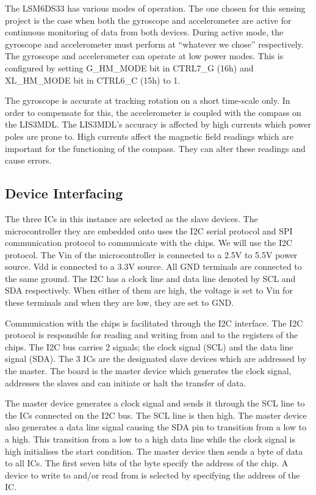 \documentclass[12pt]{article}
\begin{document}
The LSM6DS33 has various modes of operation. The one chosen for this sensing project is the case when both the gyroscope and accelerometer are active for continuous monitoring of data from both devices. During active mode, the gyroscope and accelerometer must perform at “whatever we chose” respectively. The gyroscope and accelerometer can operate at low power modes. This is configured by setting G_HM_MODE bit in CTRL7_G (16h) and XL_HM_MODE bit in CTRL6_C (15h) to 1. 

The gyroscope is accurate at tracking rotation on a short time-scale only. In order to compensate for this, the accelerometer is coupled with the compass on the LIS3MDL.
The LIS3MDL’s accuracy is affected by high currents which power poles are prone to. High currents affect the magnetic field readings which are important for the functioning of the compass. They can alter these readings and cause errors.
\subsection{Device Interfacing}
The three ICs in this instance are selected as the slave devices. The microcontroller they are embedded onto uses the I2C serial protocol and SPI communication protocol to communicate with the chips. We will use the I2C protocol. The Vin of the microcontroller is connected to a 2.5V to 5.5V power source. Vdd is connected to a 3.3V source. All GND terminals are connected to the same ground. The I2C has a clock line and data line denoted by SCL and SDA respectively. When either of them are high, the voltage is set to Vin for these terminals and when they are low, they are set to GND. 

Communication with the chips is facilitated through the I2C interface. The I2C protocol is responsible for reading and writing from and to the registers of the chips. The I2C bus carries 2 signals; the clock signal (SCL) and the data line signal (SDA). The 3 ICs are the designated slave devices which are addressed by the master. The board is the master device which generates the clock signal, addresses the slaves and can initiate or halt the transfer of data.

The master device generates a clock signal and sends it through the SCL line to the ICs connected on the I2C bus. The SCL line is then high. The master device also generates a data line signal causing the SDA pin to transition from a low to a high. This transition from a low to a high data line while the clock signal is high initialises the start condition. 
The master device then sends a byte of data to all ICs. The first seven bits of the byte specify the address of the chip. A device to write to and/or read from is selected by specifying the address of the IC. 
\end{document}
